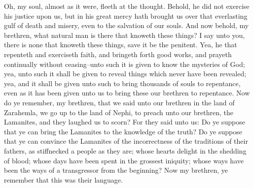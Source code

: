 Oh, my soul, almost as it were, fleeth at the thought.  Behold, he did not exercise his justice upon us, but in his great mercy hath brought us over that everlasting gulf of death and misery, even to the salvation of our souls.
\bverse \iffalse And now behold, my brethren, what natural man is there that knoweth these things? I say unto you, there is none that knoweth these things, save it be the penitent. \fi
And now behold, my brethren, what natural man is there that knoweth these things? I say unto you, there is none that knoweth these things, save it be the penitent.
\bverse \iffalse Yea, he that repenteth and exerciseth faith, and bringeth forth good works, and prayeth continually without ceasing--unto such it is given to know the mysteries of God; yea, unto such it shall be given to reveal things which never have been revealed; yea, and it shall be given unto such to bring thousands of souls to repentance, even as it has been given unto us to bring these our brethren to repentance. \fi
Yea, he that repenteth and exerciseth faith, and bringeth forth good works, and prayeth continually without ceasing--unto such it is given to know the mysteries of God; yea, unto such it shall be given to reveal things which never have been revealed; yea, and it shall be given unto such to bring thousands of souls to repentance, even as it has been given unto us to bring these our brethren to repentance.
\bverse \iffalse Now do ye remember, my brethren, that we said unto our brethren in the land of Zarahemla, we go up to the land of Nephi, to preach unto our brethren, the Lamanites, and they laughed us to scorn? \fi
Now do ye remember, my brethren, that we said unto our brethren in the land of Zarahemla, we go up to the land of Nephi, to preach unto our brethren, the Lamanites, and they laughed us to scorn?
\bverse \iffalse For they said unto us: Do ye suppose that ye can bring the Lamanites to the knowledge of the truth? Do ye suppose that ye can convince the Lamanites of the incorrectness of the traditions of their fathers, as stiffnecked a people as they are; whose hearts delight in the shedding of blood; whose days have been spent in the grossest iniquity; whose ways have been the ways of a transgressor from the beginning? Now my brethren, ye remember that this was their language. \fi
For they said unto us: Do ye suppose that ye can bring the Lamanites to the knowledge of the truth? Do ye suppose that ye can convince the Lamanites of the incorrectness of the traditions of their fathers, as stiffnecked a people as they are; whose hearts delight in the shedding of blood; whose days have been spent in the grossest iniquity; whose ways have been the ways of a transgressor from the beginning? Now my brethren, ye remember that this was their language.
